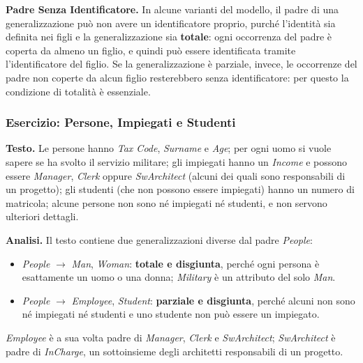 \documentclass[12pt]{extarticle}
\begin{document}
\medskip
\noindent \textbf{Padre Senza Identificatore.} In alcune varianti del modello, il padre di una generalizzazione può non avere un identificatore proprio, purché l'identità sia definita nei figli e la generalizzazione sia \textbf{totale}: ogni occorrenza del padre è coperta da almeno un figlio, e quindi può essere identificata tramite l'identificatore del figlio. Se la generalizzazione è parziale, invece, le occorrenze del padre non coperte da alcun figlio resterebbero senza identificatore: per questo la condizione di totalità è essenziale.

\subsubsection{Esercizio: Persone, Impiegati e Studenti}

\noindent \textbf{Testo.} Le persone hanno \textit{Tax Code}, \textit{Surname} e \textit{Age}; per ogni uomo si vuole sapere se ha svolto il servizio militare; gli impiegati hanno un \textit{Income} e possono essere \textit{Manager}, \textit{Clerk} oppure \textit{SwArchitect} (alcuni dei quali sono responsabili di un progetto); gli studenti (che non possono essere impiegati) hanno un numero di matricola; alcune persone non sono né impiegati né studenti, e non servono ulteriori dettagli.

\medskip
\noindent \textbf{Analisi.} Il testo contiene due generalizzazioni diverse dal padre \textit{People}:
\begin{itemize}
    \item \textit{People} $\to$ \textit{Man}, \textit{Woman}: \textbf{totale e disgiunta}, perché ogni persona è esattamente un uomo o una donna; \textit{Military} è un attributo del solo \textit{Man}.
    \item \textit{People} $\to$ \textit{Employee}, \textit{Student}: \textbf{parziale e disgiunta}, perché alcuni non sono né impiegati né studenti e uno studente non può essere un impiegato.
\end{itemize}
\textit{Employee} è a sua volta padre di \textit{Manager}, \textit{Clerk} e \textit{SwArchitect}; \textit{SwArchitect} è padre di \textit{InCharge}, un sottoinsieme degli architetti responsabili di un progetto.
\end{document}
